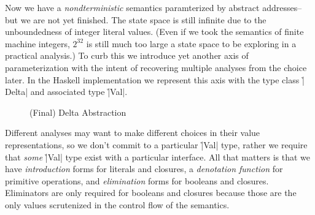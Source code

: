 Now we have a \textit{nondterministic} semantics paramterized by abstract
addresses--but we are not yet finished.
%
The state space is still infinite due to the unboundedness of integer literal
values.
%
(Even if we took the semantics of finite machine integers, $2^{32}$ is still much
too large a state space to be exploring in a practical analysis.)
%
To curb this we introduce yet another axis of parameterization with the intent
of recovering multiple analyses from the choice later.
%
In the Haskell implementation we represent this axis with the type class
\h|Delta| and associated type \h|Val|.
%
\begin{figure}[H]
\caption*{(Final) Delta Abstraction}
\end{figure}
\noindent
%
Different analyses may want to make different choices in their value
representations, so we don't commit to a particular \h|Val| type, rather we
require that \textit{some} \h|Val| type exist with a particular interface.
%
All that matters is that we have \textit{introduction} forms for literals and
closures, a \textit{denotation function} for primitive operations, and
\textit{elimination} forms for booleans and closures.
%
Eliminators are only required for booleans and closures because those are the
only values scrutenized in the control flow of the semantics.
